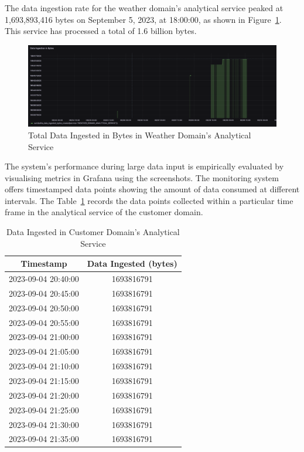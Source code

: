 \documentclass[preprint,12pt]{elsarticle}
\begin{document}
The data ingestion rate for the weather domain's analytical service peaked at 1,693,893,416 bytes on September 5, 2023, at 18:00:00, as shown in Figure~\ref{totalDataIngestedinBytesInWeatherDomainsAnalyticalService}. This service has processed a total of 1.6 billion bytes.

\begin{figure}[h!]
  \centering
  \includegraphics[width=\textwidth]{images/weather-domain-ingested-data-in-bytes.png}
  \caption{Total Data Ingested in Bytes in Weather Domain's Analytical Service}
  \label{totalDataIngestedinBytesInWeatherDomainsAnalyticalService}
\end{figure}

The system's performance during large data input is empirically evaluated by visualising metrics in Grafana using the screenshots. The monitoring system offers timestamped data points showing the amount of data consumed at different intervals. The Table~\ref{dataIngestedInCustomerDomainAnalyticalServiceTable} records the data points collected within a particular time frame in the analytical service of the customer domain.


\begin{table}[ht]
  \centering
  \caption{Data Ingested in Customer Domain's Analytical Service}
  \begin{tabular}{|c|c|}
  \hline
  \textbf{Timestamp} & \textbf{Data Ingested (bytes)} \\
  \hline
  2023-09-04 20:40:00 & 1693816791 \\
  2023-09-04 20:45:00 & 1693816791 \\
  2023-09-04 20:50:00 & 1693816791 \\
  2023-09-04 20:55:00 & 1693816791 \\
  2023-09-04 21:00:00 & 1693816791 \\
  2023-09-04 21:05:00 & 1693816791 \\
  2023-09-04 21:10:00 & 1693816791 \\
  2023-09-04 21:15:00 & 1693816791 \\
  2023-09-04 21:20:00 & 1693816791 \\
  2023-09-04 21:25:00 & 1693816791 \\
  2023-09-04 21:30:00 & 1693816791 \\
  2023-09-04 21:35:00 & 1693816791 \\
  \hline
  \end{tabular}
  \label{dataIngestedInCustomerDomainAnalyticalServiceTable}
\end{table}
\end{document}
